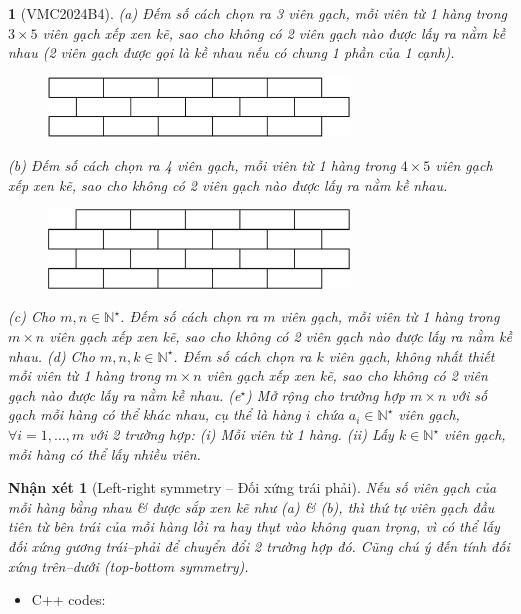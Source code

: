 \documentclass{article}
\newtheorem{baitoan}{}
\newtheorem{nhanxet}{Nhận xét}
\begin{document}
\begin{baitoan}[VMC2024B4]
	(a) Đếm số cách chọn ra 3 viên gạch, mỗi viên từ 1 hàng trong $3\times5$ viên gạch xếp xen kẽ, sao cho không có 2 viên gạch nào được lấy ra nằm kề nhau (2 viên gạch được gọi là kề nhau nếu có chung 1 phần của 1 cạnh).
	\begin{figure}[H]
		\centering
		\includegraphics[width=8cm]{brick3x5}
	\end{figure}
	(b) Đếm số cách chọn ra 4 viên gạch, mỗi viên từ 1 hàng trong $4\times5$ viên gạch xếp xen kẽ, sao cho không có 2 viên gạch nào được lấy ra nằm kề nhau.
	\begin{figure}[H]
		\centering
		\includegraphics[width=8cm]{brick4x5}
	\end{figure}
	(c) Cho $m,n\in\mathbb{N}^\star$. Đếm số cách chọn ra $m$ viên gạch, mỗi viên từ 1 hàng trong $m\times n$ viên gạch xếp xen kẽ, sao cho không có 2 viên gạch nào được lấy ra nằm kề nhau. (d) Cho $m,n,k\in\mathbb{N}^\star$. Đếm số cách chọn ra $k$ viên gạch, không nhất thiết mỗi viên từ 1 hàng trong $m\times n$ viên gạch xếp xen kẽ, sao cho không có 2 viên gạch nào được lấy ra nằm kề nhau. (e${}^\star$) Mở rộng cho trường hợp $m\times n$ với số gạch mỗi hàng có thể khác nhau, cụ thể là hàng $i$ chứa $a_i\in\mathbb{N}^\star$ viên gạch, $\forall i = 1,\ldots,m$ với 2 trường hợp: (i) Mỗi viên từ 1 hàng. (ii) Lấy $k\in\mathbb{N}^\star$ viên gạch, mỗi hàng có thể lấy nhiều viên.
\end{baitoan}

\begin{nhanxet}[Left-right symmetry -- Đối xứng trái phải]
	Nếu số viên gạch của mỗi hàng bằng nhau \& được sắp xen kẽ như (a) \& (b), thì thứ tự viên gạch đầu tiên từ bên trái của mỗi hàng lồi ra hay thụt vào không quan trọng, vì có thể lấy đối xứng gương trái--phải để chuyển đổi 2 trường hợp đó. Cũng chú ý đến tính đối xứng trên--dưới (top-bottom symmetry).
\end{nhanxet}

\begin{itemize}
	\item C++ codes:
\end{itemize}
\end{document}

